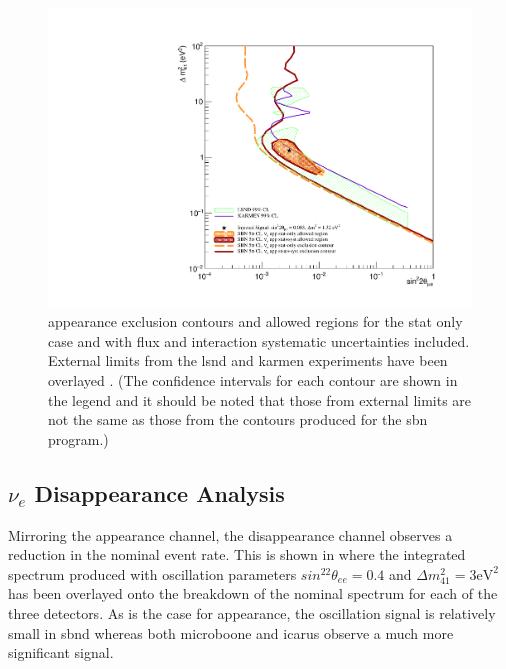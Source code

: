 \begin{figure}[h!]
    \centering
    \includegraphics[width = \largefigwidth]{figures-chap6/overlays/valor_overlays_nue_app.pdf}
    \caption[\nue appearance contours with external limits.]{\nue appearance exclusion contours and allowed regions for the stat only case and with flux and interaction systematic uncertainties included. External limits from the \gls{lsnd} and \gls{karmen} experiments have been overlayed \cite{LSND_KARMEN_nue_app_contour}. (The confidence intervals for each contour are shown in the legend and it should be noted that those from external limits are not the same as those from the contours produced for the \gls{sbn} program.)}
    \label{fig:nue_app_global_sensitivity}
\end{figure}


\clearpage
\subsection{\texorpdfstring{$\nu_e$ Disappearance Analysis}{nue Disappearance Analysis}}

Mirroring the \nue appearance channel, the \nue disappearance channel observes a reduction in the nominal \nue event rate. This is shown in  where the integrated spectrum produced with oscillation parameters $sin^22\theta_{ee} = 0.4$ and $\Delta m^2_{41} = 3 \text{eV}^2$ has been overlayed onto the breakdown of the nominal spectrum for each of the three detectors. As is the case for \nue appearance, the oscillation signal is relatively small in \gls{sbnd} whereas both \gls{microboone} and \gls{icarus} observe a much more significant signal. 

